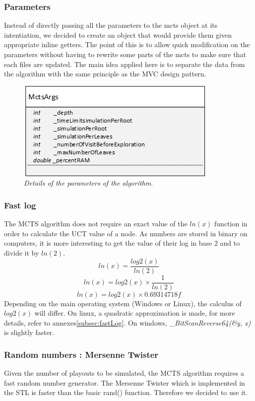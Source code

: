 \subsubsection{Parameters}
Instead of directly passing all the parameters to the mcts object at its intentiation, we decided to create an object that would provide them given appropriate inline getters. The point of this is to allow quick modification on the parameters without having to rewrite some parts of the mcts to make sure that each files are updated. The main idea applied here is to separate the data from the algorithm with the same principle as the MVC design pattern.
\begin{figure}[H] 
\centerline{\includegraphics[scale=0.8]{Data_Structure/Img/MctsArgs.png}}
\caption{\label{fig:mctsargsuml}\textit{Details of the parameters of the algorithm}.}
\end{figure}

\subsubsection{Fast log}
The MCTS algorithm does not require an exact value of the \ensuremath{ln(x)} function in order to calculate the UCT value of a node. As numbers are stored in binary on computers, it is more interesting to get the value of their log in base 2 and to divide it by \ensuremath{ln(2)}. 
\begin{equation}
ln(x) = \frac{log2(x)}{ln(2)}
\end{equation}
\begin{equation}
ln(x) = log2(x) \times \frac{1}{ln(2)}
\end{equation}
\begin{equation}
ln(x) = log2(x) \times 0.69314718f
\end{equation}
Depending on the main operating system (Windows or Linux), the calculus of \ensuremath{log2(x)} will differ. On linux, a quadratic approximation is made, for more details, refer to annexes\ref{subsec:fastLog}. On windows, \textit{\_BitScanReverse64(\&y, x)} is slightly faster. 

\subsubsection{Random numbers : Mersenne Twister}
Given the number of playouts to be simulated, the MCTS algorithm requires a fast random number generator. The Mersenne Twister which is implemented in the STL is faster than the basic rand() function. Therefore we decided to use it.


